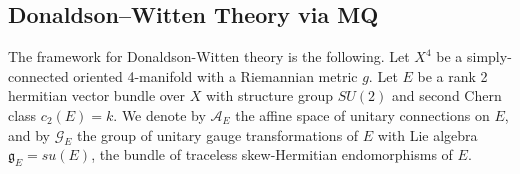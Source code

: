 \documentclass[a4paper,12pt,reqno,sumlimits]{amsart}
\theoremstyle{plain}
\theoremstyle{definition}
\newcommand{\1}{{\bf 1}}
\newcommand{\g}{{\mathfrak  g}}
\newcommand{\calA}{{\mathcal A}}
\newcommand{\calG}{{\mathcal G}}
\numberwithin{equation}{section}
\begin{document}

\subsection{Donaldson--Witten Theory via MQ}
\label{dwmq}

The framework for Donaldson-Witten theory is the following. Let $X^4$ be a
simply-connected oriented 4-manifold with a Riemannian metric $g$.  Let $E$
be a rank 2 hermitian vector bundle over $X$ with structure group $SU(2)$ and
second Chern class $c_2(E)=k$. We denote by $\calA_E$ the affine space of
unitary connections on $E$, and by $\calG_E$ the group of unitary gauge
transformations of $E$ with Lie algebra $\g_E=su(E)$, the bundle of traceless
skew-Hermitian endomorphisms of $E$.
\end{document}
